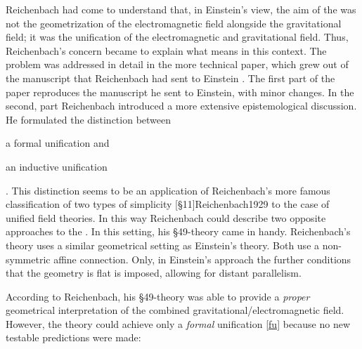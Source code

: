 \documentclass[draft]{article}
\begin{document}
Reichenbach had come to understand that, in Einstein's view, the aim of the \uftp was not the geometrization of the electromagnetic field alongside the gravitational field; it was the unification of the electromagnetic and gravitational field. Thus, Reichenbach's concern became to explain what  means in this context. The problem was addressed in detail in the more technical paper, which grew out of the manuscript that Reichenbach had sent to Einstein \citep{Reichenbach1929a}. The first part of the paper reproduces the manuscript he sent to Einstein, with minor changes. In the second, part Reichenbach introduced a more extensive epistemological discussion. He formulated the distinction between  \begin{inparaenum}[(a)]
\item \label{fu} a formal unification and \item \label{iu} an inductive unification
\end{inparaenum}. This distinction seems to be an application of  Reichenbach's more famous classification of two types of simplicity [\S11]{Reichenbach1929} to the case of unified field theories. In this way Reichenbach could describe two opposite approaches to the \uftp. In this setting, his \S49-theory came in handy. Reichenbach's theory uses a similar geometrical setting as Einstein's theory. Both use a non-symmetric affine connection. Only, in Einstein's approach the further conditions that the geometry is flat is imposed, allowing for distant parallelism.

According to Reichenbach, his \S49-theory was able to provide a \emph{proper} geometrical interpretation of the combined gravitational/electromagnetic field. However, the theory could achieve only a \emph{formal} unification \cref{fu} because no new testable predictions were made:
\end{document}
